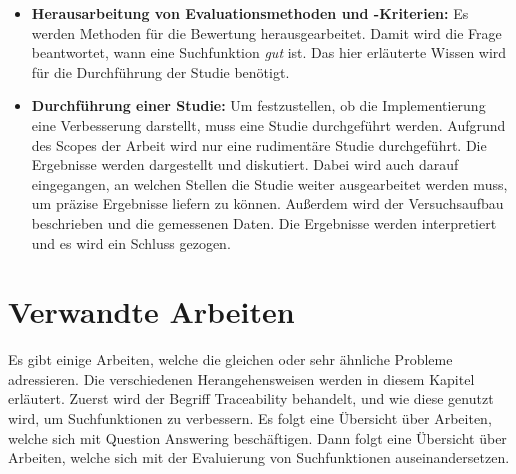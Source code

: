 \begin{itemize}
         Es wird die Weaviate\footnote{https://weaviate.io/} Vektordatenbank verwendet, um Dokumente zu indizieren.
   \item \textbf{Herausarbeitung von Evaluationsmethoden und -Kriterien:}
         Es werden Methoden für die Bewertung herausgearbeitet.
         Damit wird die Frage beantwortet, wann eine Suchfunktion \textit{gut} ist.
         Das hier erläuterte Wissen wird für die Durchführung der Studie benötigt.
   \item \textbf{Durchführung einer Studie:}
         Um festzustellen, ob die Implementierung eine Verbesserung darstellt, muss eine Studie durchgeführt werden.
         Aufgrund des Scopes der Arbeit wird nur eine rudimentäre Studie durchgeführt.
         Die Ergebnisse werden dargestellt und diskutiert.
         Dabei wird auch darauf eingegangen, an welchen Stellen die Studie weiter ausgearbeitet werden muss, um präzise Ergebnisse liefern zu können.
         Außerdem wird der Versuchsaufbau beschrieben und die gemessenen Daten.
         Die Ergebnisse werden interpretiert und es wird ein Schluss gezogen.
\end{itemize}

\section{Verwandte Arbeiten}
Es gibt einige Arbeiten, welche die gleichen oder sehr ähnliche Probleme adressieren.
Die verschiedenen Herangehensweisen werden in diesem Kapitel erläutert.
Zuerst wird der Begriff Traceability behandelt, und wie diese genutzt wird, um Suchfunktionen zu verbessern.
Es folgt eine Übersicht über Arbeiten, welche sich mit Question Answering beschäftigen.
Dann folgt eine Übersicht über Arbeiten, welche sich mit der Evaluierung von Suchfunktionen auseinandersetzen.

